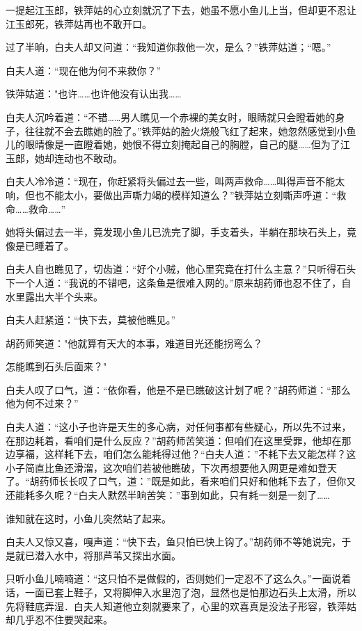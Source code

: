 \documentclass[12pt,oneside]{book}
\begin{document}
一提起江玉郎，铁萍姑的心立刻就沉了下去，她虽不愿小鱼儿上当，但却更不忍让江玉郎死，铁萍姑再也不敢开口。

过了半晌，白夫人却又问道：``我知道你救他一次，是么？''铁萍姑道；``嗯。''

白夫人道：``现在他为何不来救你？''

铁萍姑道："也许\ldots\ldots 也许他没有认出我\ldots\ldots{}

白夫人沉吟着道：``不错\ldots\ldots 男人瞧见一个赤裸的美女时，眼睛就只会瞪着她的身子，往往就不会去瞧她的脸了。''铁萍姑的脸火烧般飞红了起来，她忽然感觉到小鱼儿的眼晴像是一直瞪着她，她恨不得立刻掩起自己的胸膛，自己的腿\ldots\ldots 但为了江玉郎，她却连动也不敢动。

白夫人冷冷道：``现在，你赶紧将头偏过去一些，叫两声救命\ldots\ldots 叫得声音不能太响，但也不能太小，要做出声嘶力竭的模样知道么？''铁萍姑立刻嘶声呼道：``救命\ldots\ldots 救命\ldots\ldots{}''

她将头偏过去一半，竟发现小鱼儿已洗完了脚，手支着头，半躺在那块石头上，竟像是已睡着了。

白夫人自也瞧见了，切齿道：``好个小贼，他心里究竟在打什么主意？''只听得石头下一个人道：``我说的不错吧，这条鱼是很难入网的。''原来胡药师也忍不住了，自水里露出大半个头来。

白夫人赶紧道：``快下去，莫被他瞧见。''

胡药师笑道："他就算有天大的本事，难道目光还能拐弯么？

怎能瞧到石头后面来？"

白夫人叹了口气，道：``依你看，他是不是已瞧破这计划了呢？''胡药师道：``那么他为何不过来？''

白夫人道：``这小子也许是天生的多心病，对任何事都有些疑心，所以先不过来，在那边耗着，看咱们是什么反应？''胡药师苦笑道：但咱们在这里受罪，他却在那边享福，这样耗下去，咱们怎么能耗得过他？``白夫人道：''不耗下去又能怎样？这小子简直比鱼还滑溜，这次咱们若被他瞧破，下次再想要他入网更是难如登天了。``胡药师长长叹了口气，道：''既是如此，看来咱们只好和他耗下去了，但你又还能耗多久呢？``白夫人默然半晌苦笑：''事到如此，只有耗一刻是一刻了\ldots\ldots{}

谁知就在这时，小鱼儿突然站了起来。

白夫人又惊又喜，嘎声道：``快下去，鱼只怕已快上钩了。''胡药师不等她说完，于是就已潜入水中，将那芦苇又探出水面。

只听小鱼儿喃喃道：``这只怕不是做假的，否则她们一定忍不了这么久。''一面说着话，一面已套上鞋子，又将脚伸入水里泡了泡，显然也是怕那边石头上太滑，所以先将鞋底弄湿．白夫人知道他立刻就要来了，心里的欢喜真是没法子形容，铁萍姑却几乎忍不住要哭起来。
\end{document}
